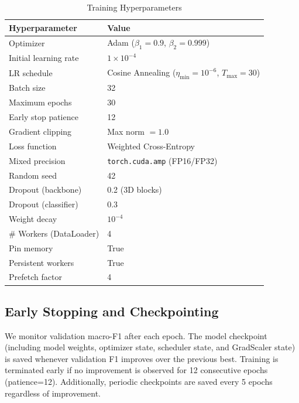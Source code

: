 \documentclass[journal]{IEEEtran}
\begin{document}
\begin{table}[t]
  \caption{Training Hyperparameters}
  \label{tab:hyperparams}
  \centering
  \begin{tabular}{ll}
    \toprule
    Hyperparameter & Value \\
    \midrule
    Optimizer              & Adam ($\beta_1{=}0.9$, $\beta_2{=}0.999$) \\
    Initial learning rate  & $1\times10^{-4}$ \\
    LR schedule            & Cosine Annealing ($\eta_{\min}=10^{-6}$, $T_{\max}=30$) \\
    Batch size             & 32 \\
    Maximum epochs         & 30 \\
    Early stop patience    & 12 \\
    Gradient clipping      & Max norm $= 1.0$ \\
    Loss function          & Weighted Cross-Entropy \\
    Mixed precision        & \texttt{torch.cuda.amp} (FP16/FP32) \\
    Random seed            & 42 \\
    Dropout (backbone)     & 0.2 (3D blocks) \\
    Dropout (classifier)   & 0.3 \\
    Weight decay           & $10^{-4}$ \\
    \# Workers (DataLoader)& 4 \\
    Pin memory             & True \\
    Persistent workers     & True \\
    Prefetch factor        & 4 \\
    \bottomrule
  \end{tabular}
\end{table}

\subsection{Early Stopping and Checkpointing}
\label{sec:earlystop}

We monitor validation macro-F1 after each epoch. The model checkpoint (including model weights, optimizer state, scheduler state, and GradScaler state) is saved whenever validation F1 improves over the previous best. Training is terminated early if no improvement is observed for 12 consecutive epochs (patience=12). Additionally, periodic checkpoints are saved every 5 epochs regardless of improvement.
\end{document}
